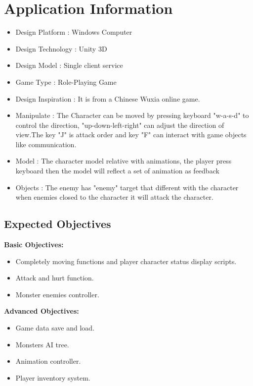 \section{Application Information}
\begin{itemize}
\item Design Platform
:
Windows Computer
\\
\item Design Technology
:
Unity 3D
\\
\item Design Model
:
Single client service
\\
\item Game Type
:
Role-Playing Game
\\
\item Design Inspiration
:
It is from a Chinese Wuxia online game.
\\
\item Manipulate
:
The Character can be moved by pressing keyboard "w-a-s-d" to control the direction, "up-down-left-right" can adjust the direction of view.The key "J" is attack order and key "F" can interact with game objects like communication.
\\
\item Model
:
The character model relative with animations, the player press keyboard then the model will reflect a set of animation as feedback
\\
\item Objects
:
The enemy has "enemy" target that different with the character when enemies closed to the character it will attack the character.
\end{itemize}

\subsection{Expected Objectives}
{\textbf{Basic Objectives:}}

\begin{itemize}
\item Completely moving functions and player character status display scripts.

\item Attack and hurt function.

\item Monster enemies controller.
\end{itemize}
{\textbf{Advanced Objectives:}}
\begin{itemize}
\item Game data save and load.

\item Monsters AI tree.

\item Animation controller.

\item Player inventory system.
\end{itemize}


